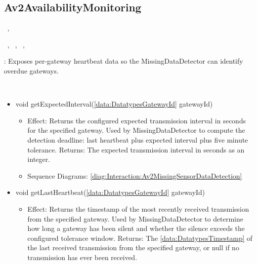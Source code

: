   \subsection{Av2AvailabilityMonitoring}\label{int:InterfacesAv2AvailabilityMonitoring}
    \begin{description}
      \item[Provided by:] \iconcomponent{}~, \iconcomponent{}~
      \item[Required by:] \iconcomponent{}~, \iconcomponent{}~, \iconcomponent{}~, \iconcomponent{}~ 
           \item[Description]: Exposes per-gateway heartbeat data so the MissingDataDetector can identify overdue gateways.
      \item[Operations:] ~
    \begin{itemize}[noitemsep,nolistsep,leftmargin=-.25cm]
      \item \textsf{void getExpectedInterval(\ref{data:DatatypesGatewayId} gatewayId)}
        \begin{itemize}[noitemsep,nolistsep]
           \item Effect: Returns the configured expected transmission interval in seconds for the specified gateway. Used by MissingDataDetector to compute the detection deadline: last heartbeat plus expected interval plus five minute tolerance.
Returns: The expected transmission interval in seconds as an integer. 
           \item Sequence Diagrams: \cref{diag:Interaction:Av2MissingSensorDataDetection}
        \end{itemize}
      \item \textsf{void getLastHeartbeat(\ref{data:DatatypesGatewayId} gatewayId)}
        \begin{itemize}[noitemsep,nolistsep]
           \item Effect: Returns the timestamp of the most recently received transmission from the specified gateway. Used by MissingDataDetector to determine how long a gateway has been silent and whether the silence exceeds the configured tolerance window.
Returns: The \ref{data:DatatypesTimestamp} of the last received transmission from the specified gateway, or null if no transmission has ever been received. 

\end{itemize}
\end{itemize}
\end{description}
